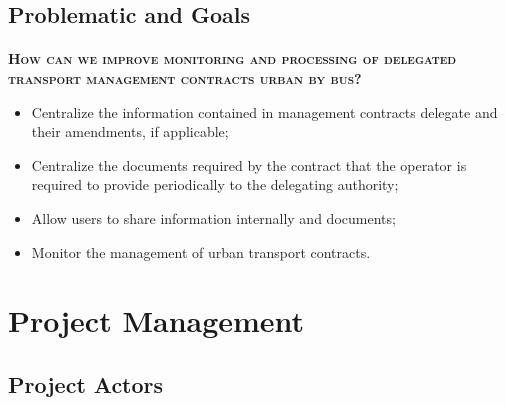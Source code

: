 \subsection{Problematic and Goals}
\begin{frame}{\insertsectionhead}
  \framesubtitle{\insertsubsectionhead}
  \textbf{\textsc{How can we improve monitoring and
  processing of delegated transport management contracts
  urban by bus?}}
\begin{itemize}
  \item Centralize the information contained in management contracts
  delegate and their amendments, if applicable;
  \item Centralize the documents required by the contract that the operator is
  required to provide periodically to the delegating authority;
  \item Allow users to share information internally
  and documents;
  \item Monitor the management of urban transport contracts.
\end{itemize}
\end{frame}
\section{Project Management}

\subsection{Project Actors}

